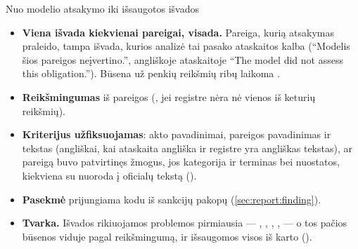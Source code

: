 \begin{codebox}{Nuo modelio atsakymo iki išsaugotos išvados}
\begin{itemize}
  \item \textbf{Viena išvada kiekvienai pareigai, visada.} Pareiga, kurią atsakymas praleido,
    tampa  išvada, kurios analizė tai pasako ataskaitos kalba
    (\enquote{Modelis šios pareigos neįvertino.}, angliškoje ataskaitoje \enquote{The model
    did not assess this obligation.}). Būsena už penkių reikšmių ribų laikoma .
  \item \textbf{Reikšmingumas} iš pareigos (, jei registre nėra nė vienos iš
    keturių reikšmių).
  \item \textbf{Kriterijus užfiksuojamas}: akto pavadinimai, pareigos pavadinimas ir tekstas
    (angliškai, kai ataskaita angliška ir registre yra angliškas tekstas), ar pareigą buvo
    patvirtinęs žmogus, jos kategorija ir terminas bei nuostatos, kiekviena su nuoroda į
    oficialų tekstą ().
  \item \textbf{Pasekmė} prijungiama kodu iš sankcijų pakopų (\cref{sec:report:finding}).
  \item \textbf{Tvarka.} Išvados rikiuojamos problemos pirmiausia --- ,
    , , ,  --- o tos pačios būsenos
    viduje pagal reikšmingumą, ir išsaugomos visos iš karto ().
\end{itemize}
\end{codebox}

